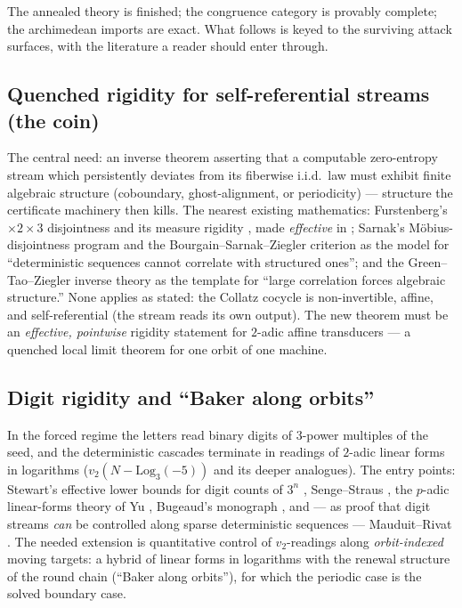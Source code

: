 \documentclass[11pt]{article}
\newcommand{\vt}{v_2}
\begin{document}
The annealed theory is finished; the congruence category is provably
complete; the archimedean imports are exact.  What follows is keyed to
the surviving attack surfaces, with the literature a reader should
enter through.

\subsection{Quenched rigidity for self-referential streams (the coin)}
The central need: an inverse theorem asserting that a computable
zero-entropy stream which persistently deviates from its fiberwise
i.i.d.\ law must exhibit finite algebraic structure (coboundary,
ghost-alignment, or periodicity) --- structure the certificate
machinery then kills.  The nearest existing mathematics:
Furstenberg's $\times2\times3$ disjointness and its measure rigidity
\cite{Furstenberg,Rudolph,Host}, made \emph{effective} in
\cite{BLMV}; Sarnak's M\"obius-disjointness program and the
Bourgain--Sarnak--Ziegler criterion \cite{Sarnak,BSZ} as the model
for ``deterministic sequences cannot correlate with structured
ones''; and the Green--Tao--Ziegler inverse theory \cite{GTZ} as the
template for ``large correlation forces algebraic structure.''  None
applies as stated: the Collatz cocycle is non-invertible, affine, and
self-referential (the stream reads its own output).  The new theorem
must be an \emph{effective, pointwise} rigidity statement for
$2$-adic affine transducers --- a quenched local limit theorem for
one orbit of one machine.

\subsection{Digit rigidity and ``Baker along orbits''}
In the forced regime the letters read binary digits of $3$-power
multiples of the seed, and the deterministic cascades terminate in
readings of $2$-adic linear forms in logarithms
($\vt(N-\mathrm{Log}_3(-5))$ and its deeper analogues).  The entry
points: Stewart's effective lower bounds for digit counts of $3^n$
\cite{Stewart}, Senge--Straus \cite{SengeStraus}, the $p$-adic
linear-forms theory of Yu \cite{Yu}, Bugeaud's monograph
\cite{Bugeaud}, and --- as proof that digit streams \emph{can} be
controlled along sparse deterministic sequences --- Mauduit--Rivat
\cite{MauduitRivat}.  The needed extension is quantitative control of
$\vt$-readings along \emph{orbit-indexed} moving targets: a hybrid of
linear forms in logarithms with the renewal structure of the round
chain (``Baker along orbits''), for which the periodic case
\cite{Baker,Rhin,SimonsDeWeger,Hercher} is the solved boundary case.
\end{document}
